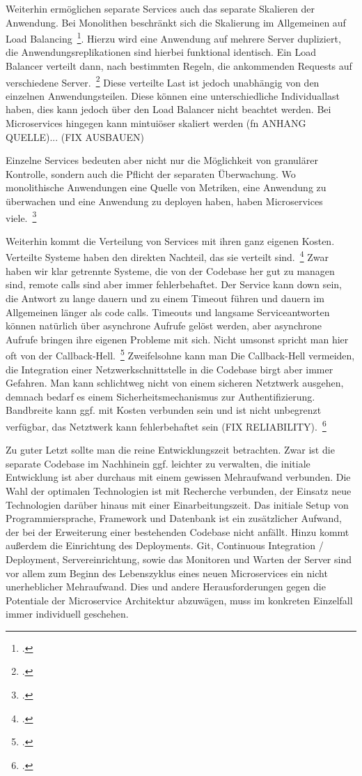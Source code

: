 Weiterhin ermöglichen separate Services auch das separate Skalieren der Anwendung. Bei Monolithen beschränkt sich die Skalierung im Allgemeinen auf Load Balancing~\footcite[vgl.][]{infaktuell}. Hierzu wird eine Anwendung auf mehrere Server dupliziert, die Anwendungsreplikationen sind hierbei funktional identisch. Ein Load Balancer verteilt dann, nach bestimmten Regeln, die ankommenden Requests auf verschiedene Server.~\footcite[vgl.][]{loadbalancing} Diese verteilte Last ist jedoch unabhängig von den einzelnen Anwendungsteilen. Diese können eine unterschiedliche Individuallast haben, dies kann jedoch über den Load Balancer nicht beachtet werden.
Bei Microservices hingegen kann mintuiöser skaliert werden (fn ANHANG QUELLE)... (FIX AUSBAUEN)

Einzelne Services bedeuten aber nicht nur die Möglichkeit von granulärer Kontrolle, sondern auch die Pflicht der separaten Überwachung. Wo monolithische Anwendungen eine Quelle von Metriken, eine Anwendung zu überwachen und eine Anwendung zu deployen haben, haben Microservices viele.~\footcite[vgl.][]{Heroku:GoMicro}

Weiterhin kommt die Verteilung von Services mit ihren ganz eigenen Kosten. Verteilte Systeme haben den direkten Nachteil, das sie verteilt sind.~\footcite[][]{microtradeoffs} Zwar haben wir klar getrennte Systeme, die von der Codebase her gut zu managen sind, remote calls sind aber immer fehlerbehaftet. Der Service kann down sein, die Antwort zu lange dauern und zu einem Timeout führen und dauern im Allgemeinen länger als code calls. Timeouts und langsame Serviceantworten können natürlich über asynchrone Aufrufe gelöst werden, aber asynchrone Aufrufe bringen ihre eigenen Probleme mit sich. Nicht umsonst spricht man hier oft von der Callback-Hell.~\footcite[vgl.][]{callbackhell} Zweifelsohne kann man Die Callback-Hell vermeiden, die Integration einer Netzwerkschnittstelle in die Codebase birgt aber immer Gefahren. Man kann schlichtweg nicht von einem sicheren Netztwerk ausgehen, demnach bedarf es einem Sicherheitsmechanismus zur Authentifizierung. Bandbreite kann ggf. mit Kosten verbunden sein und ist nicht unbegrenzt verfügbar, das Netztwerk kann fehlerbehaftet sein (FIX RELIABILITY).~\footcite[vgl.][]{distributedfallacies}

Zu guter Letzt sollte man die reine Entwicklungszeit betrachten. Zwar ist die separate Codebase im Nachhinein ggf. leichter zu verwalten, die initiale Entwicklung ist aber durchaus mit einem gewissen Mehraufwand verbunden. Die Wahl der optimalen Technologien ist mit Recherche verbunden, der Einsatz neue Technologien darüber hinaus mit einer Einarbeitungszeit. Das initiale Setup von Programmiersprache, Framework und Datenbank ist ein zusätzlicher Aufwand, der bei der Erweiterung einer bestehenden Codebase nicht anfällt. Hinzu kommt außerdem die Einrichtung des Deployments. Git, Continuous Integration / Deployment, Servereinrichtung, sowie das Monitoren und Warten der Server sind vor allem zum Beginn des Lebenszyklus eines neuen Microservices ein nicht unerheblicher Mehraufwand. Dies und andere Herausforderungen gegen die Potentiale der Microservice Architektur abzuwägen, muss im konkreten Einzelfall immer individuell geschehen.

